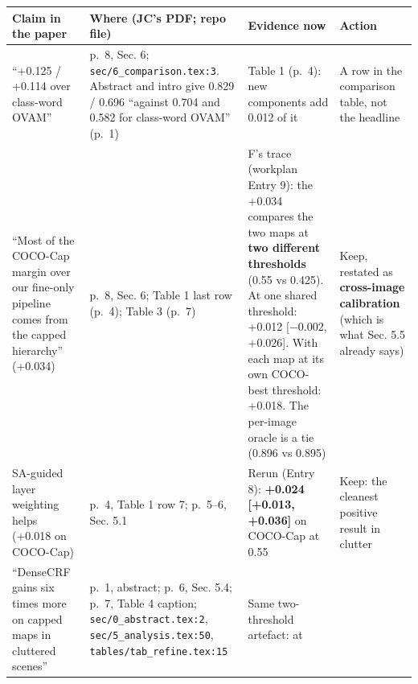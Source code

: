 \documentclass[
  10pt,
]{article}
\newcounter{none} %
\begin{document}
{\def\LTcaptype{none} %
\begin{longtable}[]{@{}
  >{\raggedright\arraybackslash}p{}
  >{\raggedright\arraybackslash}p{}
  >{\raggedright\arraybackslash}p{}
  >{\raggedright\arraybackslash}p{}@{}}
\toprule\noalign{}
\begin{minipage}[b]{\linewidth}\raggedright
Claim in the paper
\end{minipage} & \begin{minipage}[b]{\linewidth}\raggedright
Where (JC's PDF; repo file)
\end{minipage} & \begin{minipage}[b]{\linewidth}\raggedright
Evidence now
\end{minipage} & \begin{minipage}[b]{\linewidth}\raggedright
Action
\end{minipage} \\
\midrule\noalign{}
\endhead
\bottomrule\noalign{}
\endlastfoot
``+0.125 / +0.114 over class-word OVAM'' & p.~8, Sec. 6;
\texttt{sec/6\_comparison.tex:3}. Abstract and intro give 0.829 / 0.696
``against 0.704 and 0.582 for class-word OVAM'' (p.~1) & Table 1 (p.~4):
new components add 0.012 of it & A row in the comparison table, not the
headline \\
``Most of the COCO-Cap margin over our fine-only pipeline comes from the
capped hierarchy'' (+0.034) & p.~8, Sec. 6; Table 1 last row (p.~4);
Table 3 (p.~7) & F's trace (workplan Entry 9): the +0.034 compares the
two maps at \textbf{two different thresholds} (0.55 vs 0.425). At one
shared threshold: +0.012 {[}\ensuremath{-}0.002, +0.026{]}. With each map at its own
COCO-best threshold: +0.018. The per-image oracle is a tie (0.896 vs
0.895) & Keep, restated as \textbf{cross-image calibration} (which is
what Sec. 5.5 already says) \\
SA-guided layer weighting helps (+0.018 on COCO-Cap) & p.~4, Table 1 row
7; p.~5--6, Sec. 5.1 & Rerun (Entry 8): \textbf{+0.024 {[}+0.013,
+0.036{]}} on COCO-Cap at 0.55 & Keep: the cleanest positive result in
clutter \\
``DenseCRF gains six times more on capped maps in cluttered scenes'' &
p.~1, abstract; p.~6, Sec. 5.4; p.~7, Table 4 caption;
\texttt{sec/0\_abstract.tex:2}, \texttt{sec/5\_analysis.tex:50},
\texttt{tables/tab\_refine.tex:15} & Same two-threshold artefact: at

\end{longtable}}
\end{document}
